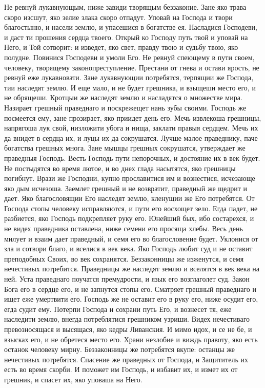 \mychapterending

\begin{mymulticols}





Не ревнуй лукавнующым, ниже завиди творящым беззаконие. Зане яко трава скоро изсшут, яко зелие злака скоро отпадут. Уповай на Господа и твори благостыню, и насели землю, и упасешися в богатстве ея. Насладися Господеви, и даст ти прошения сердца твоего. Открый ко Господу путь твой и уповай на Него, и Той сотворит: и изведет, яко свет, правду твою и судьбу твою, яко полудне. Повинися Господеви и умоли Его. Не ревнуй спеющему в пути своем, человеку, творящему законопреступление. Престани от гнева и остави ярость, не ревнуй еже лукавновати. Зане лукавнующии потребятся, терпящии же Господа, тии наследят землю. И еще мало, и не будет грешника, и взыщеши место его, и не обрящеши. Кротцыи же наследят землю и насладятся о множестве мира. Назирает грешный праведнаго и поскрежещет нань зубы своими. Господь же посмеется ему, зане прозирает, яко приидет день его. Мечь извлекоша грешницы, напрягоша лук свой, низложити убога и нища, заклати правыя сердцем. Мечь их да внидет в сердца их, и луцы их да сокрушатся. Лучше малое праведнику, паче богатства грешных многа. Зане мышцы грешных сокрушатся, утверждает же праведныя Господь. Весть Господь пути непорочных, и достояние их в век будет. Не постыдятся во время лютое, и во днех глада насытятся, яко грешницы погибнут. Врази же Господни, купно прославитися им и вознестися, исчезающе яко дым исчезоша. Заемлет грешный и не возвратит, праведный же щедрит и дает. Яко благословящии Его наследят землю, кленущии же Его потребятся. От Господа стопы человеку исправляются, и пути его восхощет зело. Егда падет, не разбиется, яко Господь подкрепляет руку его. Юнейший бых, ибо состарехся, и не видех праведника оставлена, ниже семени его просяща хлебы. Весь день милует и взаим дает праведный, и семя его во благословение будет. Уклонися от зла и сотвори благо, и вселися в век века. Яко Господь любит суд и не оставит преподобных Своих, во век сохранятся. Беззаконницы же изженутся, и семя нечестивых потребится. Праведницы же наследят землю и вселятся в век века на ней. Уста праведнаго поучатся премудрости, и язык его возглаголет суд. Закон Бога его в сердце его, и не запнутся стопы его. Сматряет грешный праведнаго и ищет еже умертвити его. Господь же не оставит его в руку его, ниже осудит его, егда судит ему. Потерпи Господа и сохрани путь Его, и вознесет тя, еже наследити землю, внегда потреблятися грешником узриши. Видех нечестиваго превозносящася и высящася, яко кедры Ливанския. И мимо идох, и се не бе, и взысках его, и не обретеся место его. Храни незлобие и виждь правоту, яко есть останок человеку мирну. Беззаконницы же потребятся вкупе: останцы же нечестивых потребятся. Спасение же праведных от Господа, и Защититель их есть во время скорби. И поможет им Господь, и избавит их, и измет их от грешник, и спасет их, яко уповаша на Него.



\end{mymulticols}
